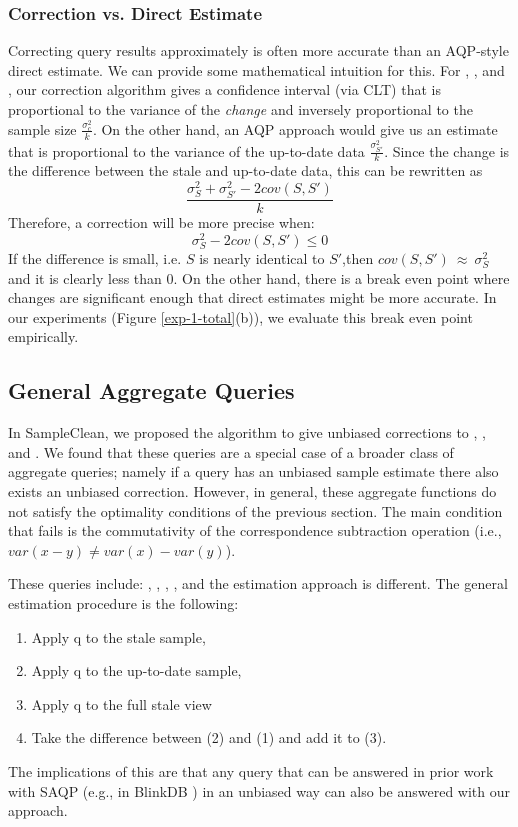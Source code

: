 \subsubsection{Correction vs. Direct Estimate}
Correcting query results approximately is often more accurate than an AQP-style direct estimate. 
\sloppy
We can provide some mathematical intuition for this.
For \sumfunc, \countfunc, and \avgfunc, our correction algorithm gives a confidence interval (via CLT) that is
proportional to the variance of the \emph{change} and inversely proportional to the sample size 
$\frac{\sigma_{c}^2}{k}$.
On the other hand, an AQP approach would give us an estimate that is proportional to the variance of the up-to-date data 
$\frac{\sigma_{S'}^2}{k}$.
Since the change is the difference between the stale and up-to-date data, this can be rewritten as
\[\frac{\sigma_{S}^2 + \sigma_{S'}^2 - 2cov(S,S')}{k}\]
Therefore, a correction will be more precise when:
\[\sigma_{S}^2 - 2cov(S,S') \le 0 \]
If the difference is small, i.e. $S$ is nearly identical to $S'$,then $cov(S,S')~\approx~\sigma_{S}^2$ and it is clearly less than 0. 
On the other hand, there is a break even point where changes are significant enough that direct estimates might be more accurate.
In our experiments (Figure \ref{exp-1-total}(b)), we evaluate this break even point empirically. 

\fussy

\subsection{General Aggregate Queries}
In SampleClean, we proposed the \nsc algorithm to give unbiased corrections to \sumfunc, \countfunc, and \avgfunc.
We found that these queries are a special case of a broader class of aggregate queries; namely if a query has an unbiased sample estimate there also exists an unbiased correction.
However, in general, these aggregate functions do not satisfy the optimality conditions of the previous section.
The main condition that fails is the commutativity of the correspondence subtraction operation (i.e., $var(x-y) \ne var(x) - var(y)$).

These queries include: \histfunc, \corrfunc, \varfunc, \covfunc, and the estimation approach is different.
The general estimation procedure is the following:
\begin{enumerate}[noitemsep]
\item Apply q to the stale sample, 
\item Apply q to the up-to-date sample, 
\item Apply q to the full stale view
\item Take the difference between (2) and (1) and add it to (3).
\end{enumerate}
The implications of this are that any query that can be answered in prior work with SAQP (e.g., in BlinkDB \cite{AgarwalMPMMS13}) in an unbiased way can also be answered with our approach.

